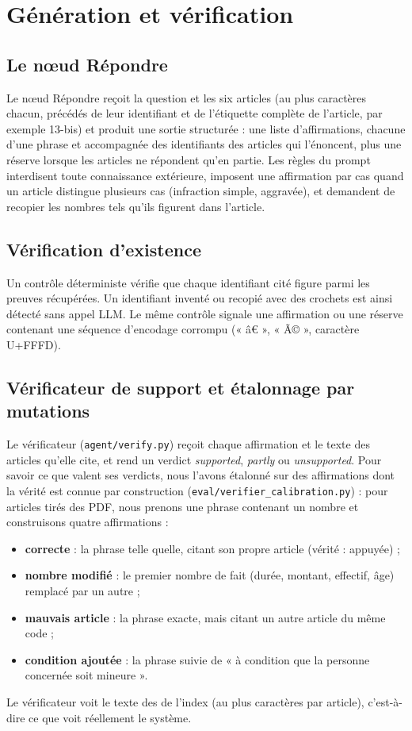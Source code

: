 \section{Génération et vérification}\label{sec:generation}

\subsection{Le nœud Répondre}
Le nœud Répondre reçoit la question et les six articles (au plus \NCharsAnswer{} caractères chacun, précédés de leur
identifiant et de l'étiquette complète de l'article, par exemple 13-bis) et produit une sortie structurée :
une liste d'affirmations, chacune d'une phrase et accompagnée des identifiants des articles qui l'énoncent, plus une réserve
lorsque les articles ne répondent qu'en partie. Les règles du prompt interdisent toute connaissance extérieure, imposent une
affirmation par cas quand un article distingue plusieurs cas (infraction simple, aggravée), et demandent de recopier les
nombres tels qu'ils figurent dans l'article.

\subsection{Vérification d'existence}
Un contrôle déterministe vérifie que chaque identifiant cité figure parmi les preuves récupérées. Un identifiant inventé ou
recopié avec des crochets est ainsi détecté sans appel LLM. Le même contrôle signale une affirmation ou une réserve
contenant une séquence d'encodage corrompu (« â€ », « Ã© », caractère U+FFFD).

\subsection{Vérificateur de support et étalonnage par mutations}
Le vérificateur (\texttt{agent/verify.py}) reçoit chaque affirmation et le texte des articles qu'elle cite, et rend un verdict
\emph{supported}, \emph{partly} ou \emph{unsupported}. Pour savoir ce que valent ses verdicts, nous l'avons étalonné sur des
affirmations dont la vérité est connue par construction (\texttt{eval/verifier\_calibration.py}) : pour \NCalibN{} articles
tirés des PDF, nous prenons une phrase contenant un nombre et construisons quatre affirmations :
\begin{itemize}
  \item \textbf{correcte} : la phrase telle quelle, citant son propre article (vérité : appuyée) ;
  \item \textbf{nombre modifié} : le premier nombre de fait (durée, montant, effectif, âge) remplacé par un autre ;
  \item \textbf{mauvais article} : la phrase exacte, mais citant un autre article du même code ;
  \item \textbf{condition ajoutée} : la phrase suivie de « à condition que la personne concernée soit mineure ».
\end{itemize}
Le vérificateur voit le texte des  de l'index (au plus \NCharsVerify{} caractères par article), c'est-à-dire
ce que voit réellement le système.

